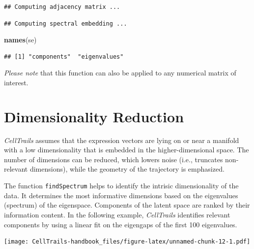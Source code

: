 \documentclass[]{book}
\newenvironment{Shaded}{\begin{snugshade}}{\end{snugshade}}
\newcommand{\KeywordTok}[1]{\textcolor[rgb]{0.13,0.29,0.53}{\textbf{#1}}}
\newcommand{\DataTypeTok}[1]{\textcolor[rgb]{0.13,0.29,0.53}{#1}}
\newcommand{\DecValTok}[1]{\textcolor[rgb]{0.00,0.00,0.81}{#1}}
\newcommand{\StringTok}[1]{\textcolor[rgb]{0.31,0.60,0.02}{#1}}
\newcommand{\CommentTok}[1]{\textcolor[rgb]{0.56,0.35,0.01}{\textit{#1}}}
\newcommand{\OperatorTok}[1]{\textcolor[rgb]{0.81,0.36,0.00}{\textbf{#1}}}
\newcommand{\NormalTok}[1]{#1}
\theoremstyle{definition}
\theoremstyle{definition}
\theoremstyle{definition}
\theoremstyle{remark}
\begin{document}
\begin{verbatim}
## Computing adjacency matrix ...
\end{verbatim}

\begin{verbatim}
## Computing spectral embedding ...
\end{verbatim}

\begin{Shaded}
\begin{Highlighting}[]
\KeywordTok{names}\NormalTok{(se)}
\end{Highlighting}
\end{Shaded}

\begin{verbatim}
## [1] "components"  "eigenvalues"
\end{verbatim}

\emph{Please note} that this function can also be applied to any
numerical matrix of interest.

\section{Dimensionality Reduction}\label{dimensionality-reduction}

\emph{CellTrails} assumes that the expression vectors are lying on or
near a manifold with a low dimensionality that is embedded in the
higher-dimensional space. The number of dimensions can be reduced, which
lowers noise (i.e., truncates non-relevant dimensions), while the
geometry of the trajectory is emphasized.

The function \texttt{findSpectrum} helps to identify the intrisic
dimensionality of the data. It determines the most informative
dimensions based on the eigenvalues (spectrum) of the eigenspace.
Components of the latent space are ranked by their information content.
In the following example, \emph{CellTrails} identifies relevant
components by using a linear fit on the eigengaps of the first 100
eigenvalues.

\begin{Shaded}
\end{Shaded}

\texttt{[image: CellTrails-handbook\_files/figure-latex/unnamed-chunk-12-1.pdf]}
\end{document}
